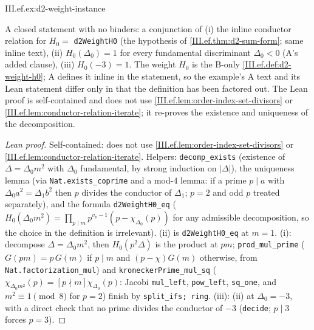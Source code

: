 \begin{example}
\end{example}
\begin{tfformal}{III.ef.ex:d2-weight-instance}
\begin{tffidelity}
A closed statement with no binders: a conjunction of (i) the inline conductor relation for $H_0=$ \texttt{d2WeightH0} (the hypothesis of \cref{III.ef.thm:d2-sum-form}; same inline text), (ii) $H_0(\Delta_0)=1$ for every fundamental discriminant $\Delta_0<0$ (A's added clause), (iii) $H_0(-3)=1$. The weight $H_0$ is the B-only \cref{III.ef.def:d2-weight-h0}; A defines it inline in the statement, so the example's A text and its Lean statement differ only in that the definition has been factored out. The Lean proof is self-contained and does not use \cref{III.ef.lem:order-index-set-divisors} or \cref{III.ef.lem:conductor-relation-iterate}; it re-proves the existence and uniqueness of the decomposition.
\end{tffidelity}
\end{tfformal}
\begin{proof}[Lean proof]
Self-contained: does not use \cref{III.ef.lem:order-index-set-divisors} or \cref{III.ef.lem:conductor-relation-iterate}. Helpers: \texttt{decomp\_exists} (existence of $\Delta=\Delta_0m^2$ with $\Delta_0$ fundamental, by strong induction on $|\Delta|$), the uniqueness lemma (via \texttt{Nat.exists\_coprime} and a mod-$4$ lemma: if a prime $p\mid a$ with $\Delta_0a^2=\Delta_1b^2$ then $p$ divides the conductor of $\Delta_1$; $p=2$ and odd $p$ treated separately), and the formula \texttt{d2WeightH0\_eq} ($H_0(\Delta_0m^2)=\prod_{p\mid m}p^{v_p-1}(p-\chi_{\Delta_0}(p))$ for any admissible decomposition, so the choice in the definition is irrelevant). (ii) is \texttt{d2WeightH0\_eq} at $m=1$. (i): decompose $\Delta=\Delta_0m^2$, then $H_0(p^2\Delta)$ is the product at $pm$; \texttt{prod\_mul\_prime} ($G(pm)=p\,G(m)$ if $p\mid m$ and $(p-\chi)G(m)$ otherwise, from \texttt{Nat.factorization\_mul}) and \texttt{kroneckerPrime\_mul\_sq} ($\chi_{\Delta_0m^2}(p)=[p\nmid m]\chi_{\Delta_0}(p)$: Jacobi \texttt{mul\_left}, \texttt{pow\_left}, \texttt{sq\_one}, and $m^2\equiv1\pmod8$ for $p=2$) finish by \texttt{split\_ifs; ring}. (iii): (ii) at $\Delta_0=-3$, with a direct check that no prime divides the conductor of $-3$ (\texttt{decide}; $p\mid3$ forces $p=3$).
\end{proof}


